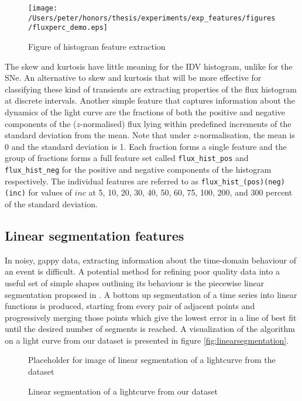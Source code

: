 	\begin{figure}[ht!]
		\centering
		\label{fig:histograms}
		\texttt{[image: /Users/peter/honors/thesis/experiments/exp\_features/figures/fluxperc\_demo.eps]}
		\caption{Figure of histogram feature extraction}
	\end{figure}
	
	The skew and kurtosis have little meaning for the IDV histogram, unlike for the SNe. An alternative to skew and kurtosis that will be more effective for classifying these kind of transients are extracting properties of the flux histogram at discrete intervals. Another simple feature that captures  information about the dynamics of the light curve are the fractions of both the positive and negative components of the ($z$-normalised) flux lying within predefined increments of the standard deviation from the mean. Note that under $z$-normalisation, the mean is 0 and the standard deviation is 1. Each fraction forms a single feature and the group of fractions forms a full feature set called \verb#flux_hist_pos# and \verb#flux_hist_neg# for the positive and negative components of the histogram respectively. The individual features are referred to as \verb#flux_hist_(pos)(neg)(inc)# for values of $inc$ at 5, 10, 20, 30, 40, 50, 60, 75, 100, 200, and 300 percent of the standard deviation.
	
	
	\subsection{Linear segmentation features}
	In noisy, gappy data, extracting information about the time-domain behaviour of an event is difficult. A potential method for refining poor quality data into a useful set of simple shapes outlining its behaviour is the piecewise linear segmentation proposed in \citet{keogh2001online}. A bottom up segmentation of a time series into linear functions is produced, starting from every pair of adjacent points and progressively merging those points which give the lowest error in a line of best fit until the desired number of segments is reached. A visualization of the algorithm on a light curve from our dataset is presented in figure \ref{fig:linearsegmentation}.
	
	\begin{figure}
		\label{fig:linsegexample}
		\centering
		Placeholder for image of linear segmentation of a lightcurve from the dataset
		\caption{Linear segmentation of a lightcurve from our dataset}
	\end{figure}
	
